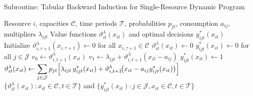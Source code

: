 \documentclass[11pt]{article}
\begin{document}
\begin{algorithm}[H]
\caption{Subroutine: Tabular Backward Induction for Single-Resource Dynamic Program}
\begin{algorithmic}[1]
\Require Resource $i$, capacities $\mathcal{C}$, time periods $\mathcal{T}$, probabilities $p_{jt}$, consumption $a_{ij}$, multipliers $\lambda_{ijt}$
\Ensure Value functions $\vartheta^\lambda_{it}(x_{it})$ and optimal decisions $y^*_{ijt}(x_{it})$
\State Initialize $\vartheta^\lambda_{i,\tau+1}(x_{i,\tau+1}) \gets 0$ for all $x_{i,\tau+1} \in \mathcal{C}$ 
 
     
        \State $\vartheta^\lambda_{it}(x_{it}) \gets 0$
        \State $y^*_{ijt}(x_{it}) \gets 0$ for all $j \in \mathcal{J}$ 
         
             
                \State $v_0 \gets \vartheta^\lambda_{i,t+1}(x_{it})$ 
                \State $v_1 \gets \lambda_{ijt} + \vartheta^\lambda_{i,t+1}(x_{it} - a_{ij})$ 
                    \State $y^*_{ijt}(x_{it}) \gets 1$ 
                \EndIf
            \EndIf
        \EndFor
        \State $\displaystyle \vartheta^\lambda_{it}(x_{it}) \gets \sum_{j\in\mathcal{J}} p_{jt}\Bigl[ \lambda_{ijt}\,y^*_{ijt}(x_{it}) + \vartheta^\lambda_{i,t+1}\!\bigl(x_{it}-a_{ij}y^*_{ijt}(x_{it})\bigr) \Bigr]$
    \EndFor
\EndFor
\State \Return $\{\vartheta^\lambda_{it}(x_{it}): x_{it} \in \mathcal{C}, t \in \mathcal{T}\}$ and $\{y^*_{ijt}(x_{it}): j \in \mathcal{J}, x_{it} \in \mathcal{C}, t \in \mathcal{T}\}$
\end{algorithmic}
\end{algorithm}

\vspace{0.5cm}
\end{document}
